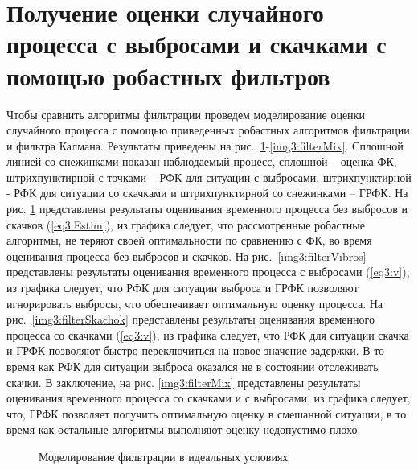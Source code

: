 \section{Получение оценки случайного процесса с выбросами и скачками с помощью робастных фильтров} \label{sect3_6}
Чтобы сравнить алгоритмы фильтрации проведем моделирование оценки случайного процесса с помощью приведенных робастных алгоритмов фильтрации и фильтра Калмана. Результаты приведены на рис. \ref{img3:filterIdeal}-\ref{img3:filterMix}. Сплошной линией со снежинками показан наблюдаемый процесс, сплошной – оценка ФК, штрихпунктирной с точками – РФК для ситуации с выбросами, штрихпунктирной - РФК для ситуации со скачками и штрихпунктирной со снежинками – ГРФК. На рис. \ref{img3:filterIdeal} представлены результаты оценивания временного процесса без выбросов и скачков (\ref{eq3:Estim}), из графика следует, что рассмотренные робастные алгоритмы, не теряют своей оптимальности по сравнению с ФК, во время оценивания процесса без выбросов и скачков.
На рис. \ref{img3:filterVibros} представлены результаты оценивания временного процесса с выбросами (\ref{eq3:v}), из графика следует, что РФК для ситуации выброса и ГРФК позволяют игнорировать выбросы, что обеспечивает оптимальную оценку процесса.
На рис. \ref{img3:filterSkachok} представлены результаты оценивания временного процесса со скачками (\ref{eq3:v}), из графика следует, что РФК для ситуации скачка и ГРФК позволяют быстро переключиться на новое значение задержки. В то время как РФК для ситуации выброса оказался не в состоянии отслеживать скачки.
В заключение, на рис. \ref{img3:filterMix} представлены результаты оценивания временного процесса со скачками и с выбросами, из графика следует, что, ГРФК позволяет получить оптимальную оценку в смешанной ситуации, в то время как остальные алгоритмы выполняют оценку недопустимо плохо.


\pgfplotsset{width=15cm, height=10cm, compat=1.3}
\begin{figure} [h]
  \center
{}
\caption{Моделирование фильтрации в идеальных условиях}
  \label{img3:filterIdeal}
\end{figure}

